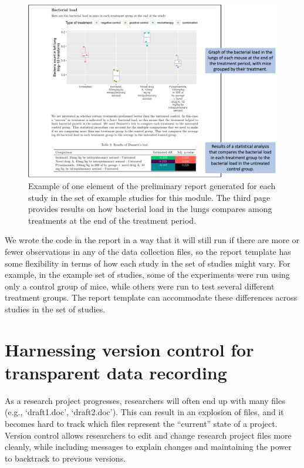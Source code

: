 \documentclass[]{tufte-book}
\begin{document}
\begin{figure}
\includegraphics[width=\textwidth]{figures/project_bact_compare_plot} \caption[Example of one element of the preliminary report generated for each study in the set of example studies for this module]{Example of one element of the preliminary report generated for each study in the set of example studies for this module. The third page provides results on how bacterial load in the lungs compares among treatments at the end of the treatment period.}\label{fig:bactcompare}
\end{figure}

We wrote the code in the report in a way that it will still run if there are
more or fewer observations in any of the data collection files, so the report
template has some flexibility in terms of how each study in the set of studies
might vary. For example, in the example set of studies, some of the experiments
were run using only a control group of mice, while others were run to test
several different treatment groups. The report template can accommodate
these differences across studies in the set of studies.

\section{Harnessing version control for transparent data recording}\label{module9}

As a research project progresses, researchers will often end up with many files
(e.g., `draft1.doc', `draft2.doc'). This can result in an explosion of files,
and it becomes hard to track which files represent the ``current'' state of a
project. Version control allows researchers to edit and change research project
files more cleanly, while including messages to explain changes and maintaining
the power to backtrack to previous versions.
\end{document}
